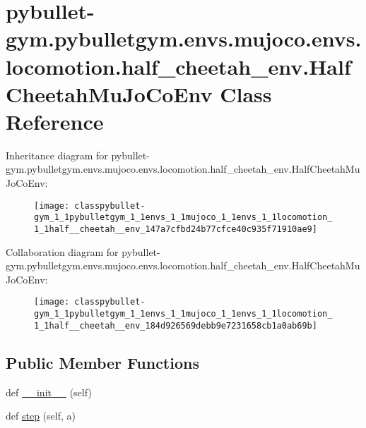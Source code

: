 \hypertarget{classpybullet-gym_1_1pybulletgym_1_1envs_1_1mujoco_1_1envs_1_1locomotion_1_1half__cheetah__env_1_1_half_cheetah_mu_jo_co_env}{}\section{pybullet-\/gym.pybulletgym.\+envs.\+mujoco.\+envs.\+locomotion.\+half\+\_\+cheetah\+\_\+env.\+Half\+Cheetah\+Mu\+Jo\+Co\+Env Class Reference}
\label{classpybullet-gym_1_1pybulletgym_1_1envs_1_1mujoco_1_1envs_1_1locomotion_1_1half__cheetah__env_1_1_half_cheetah_mu_jo_co_env}


Inheritance diagram for pybullet-\/gym.pybulletgym.\+envs.\+mujoco.\+envs.\+locomotion.\+half\+\_\+cheetah\+\_\+env.\+Half\+Cheetah\+Mu\+Jo\+Co\+Env\+:
\nopagebreak
\begin{figure}[H]
\begin{center}
\leavevmode
\texttt{[image: classpybullet-gym\_1\_1pybulletgym\_1\_1envs\_1\_1mujoco\_1\_1envs\_1\_1locomotion\_1\_1half\_\_cheetah\_\_env\_147a7cfbd24b77cfce40c935f71910ae9]}
\end{center}
\end{figure}


Collaboration diagram for pybullet-\/gym.pybulletgym.\+envs.\+mujoco.\+envs.\+locomotion.\+half\+\_\+cheetah\+\_\+env.\+Half\+Cheetah\+Mu\+Jo\+Co\+Env\+:
\nopagebreak
\begin{figure}[H]
\begin{center}
\leavevmode
\texttt{[image: classpybullet-gym\_1\_1pybulletgym\_1\_1envs\_1\_1mujoco\_1\_1envs\_1\_1locomotion\_1\_1half\_\_cheetah\_\_env\_184d926569debb9e7231658cb1a0ab69b]}
\end{center}
\end{figure}
\subsection*{Public Member Functions}
\begin{DoxyCompactItemize}
\item 
def \hyperlink{classpybullet-gym_1_1pybulletgym_1_1envs_1_1mujoco_1_1envs_1_1locomotion_1_1half__cheetah__env_1_1_half_cheetah_mu_jo_co_env_a849d6c6af5a3d1f4be4148ece726951a}{\+\_\+\+\_\+init\+\_\+\+\_\+} (self)
\item 
def \hyperlink{classpybullet-gym_1_1pybulletgym_1_1envs_1_1mujoco_1_1envs_1_1locomotion_1_1half__cheetah__env_1_1_half_cheetah_mu_jo_co_env_ac2d9222b0ca852bd9d1c32fda2093e9f}{step} (self, a)
\end{DoxyCompactItemize}
